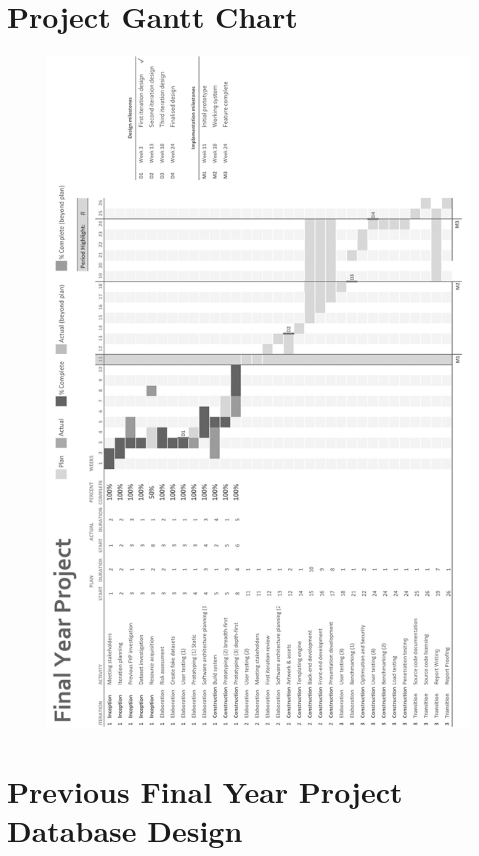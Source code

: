 \appendix
\setcounter{secnumdepth}{1}
\begin{subappendices}

  \newpage
  \section{Project Gantt Chart}
  \label{appendix:project-gantt-chart}

  \begin{figure}[H]
    \centering
    \includegraphics{assets/gantt-plan.png}
  \end{figure}

  \newpage
  \section{Previous Final Year Project Database Design}
  \label{appendix:previous-fyp-uml}


\end{subappendices}
